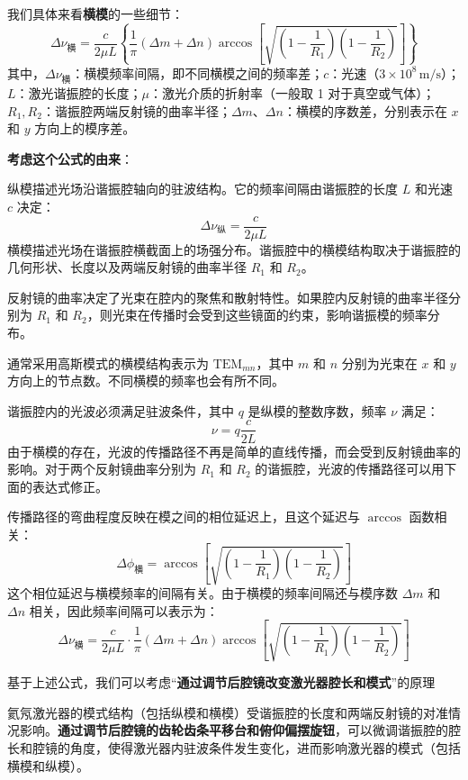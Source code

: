 \begin{enumerate}
	我们具体来看\textbf{横模}的一些细节：
	\[
	\Delta \nu_{\text{横}} = \frac{c}{2 \mu L} \left\{ \frac{1}{\pi} (\Delta m + \Delta n) \arccos \left[ \sqrt{ \left( 1 - \frac{1}{R_1} \right) \left( 1 - \frac{1}{R_2} \right) } \right] \right\}
	\]
	其中，\( \Delta \nu_{\text{横}} \)：横模频率间隔，即不同横模之间的频率差；\( c \)：光速（\(3 \times 10^8 \, \text{m/s}\)）；\( L \)：激光谐振腔的长度；\( \mu \)：激光介质的折射率（一般取 1 对于真空或气体）；\( R_1, R_2 \)：谐振腔两端反射镜的曲率半径；\( \Delta m \)、\( \Delta n \)：横模的序数差，分别表示在 \(x\) 和 \(y\) 方向上的模序差。
	
	\textbf{考虑这个公式的由来}：
	
	纵模描述光场沿谐振腔轴向的驻波结构。它的频率间隔由谐振腔的长度 \(L\) 和光速 \(c\) 决定：
	\[
	\Delta \nu_{\text{纵}} = \frac{c}{2 \mu L}
	\]
	横模描述光场在谐振腔横截面上的场强分布。谐振腔中的横模结构取决于谐振腔的几何形状、长度以及两端反射镜的曲率半径 \(R_1\) 和 \(R_2\)。
	
	反射镜的曲率决定了光束在腔内的聚焦和散射特性。如果腔内反射镜的曲率半径分别为 \(R_1\) 和 \(R_2\)，则光束在传播时会受到这些镜面的约束，影响谐振模的频率分布。
	
	通常采用高斯模式的横模结构表示为 \( \text{TEM}_{mn} \)，其中 \(m\) 和 \(n\) 分别为光束在 \(x\) 和 \(y\) 方向上的节点数。不同横模的频率也会有所不同。
	
	谐振腔内的光波必须满足驻波条件，其中 \(q\) 是纵模的整数序数，频率 \( \nu \) 满足：
	\[
	\nu = q \frac{c}{2 L}
	\]
	由于横模的存在，光波的传播路径不再是简单的直线传播，而会受到反射镜曲率的影响。对于两个反射镜曲率分别为 \(R_1\) 和 \(R_2\) 的谐振腔，光波的传播路径可以用下面的表达式修正。
	
	传播路径的弯曲程度反映在模之间的相位延迟上，且这个延迟与 \( \arccos \) 函数相关：
	\[
	\Delta \phi_{\text{横}} = \arccos \left[ \sqrt{ \left( 1 - \frac{1}{R_1} \right) \left( 1 - \frac{1}{R_2} \right) } \right]
	\]
	这个相位延迟与横模频率的间隔有关。由于横模的频率间隔还与模序数 \( \Delta m \) 和 \( \Delta n \) 相关，因此频率间隔可以表示为：
	\[
	\Delta \nu_{\text{横}} = \frac{c}{2 \mu L} \cdot \frac{1}{\pi} (\Delta m + \Delta n) \arccos \left[ \sqrt{ \left( 1 - \frac{1}{R_1} \right) \left( 1 - \frac{1}{R_2} \right) } \right]
	\]
	
	基于上述公式，我们可以考虑“\textbf{通过调节后腔镜改变激光器腔长和模式}”的原理
	
	氦氖激光器的模式结构（包括纵模和横模）受谐振腔的长度和两端反射镜的对准情况影响。\textbf{通过调节后腔镜的齿轮齿条平移台}\textbf{和俯仰偏摆旋钮}，可以微调谐振腔的腔长和腔镜的角度，使得激光器内驻波条件发生变化，进而影响激光器的模式（包括横模和纵模）。
	

\end{enumerate}
